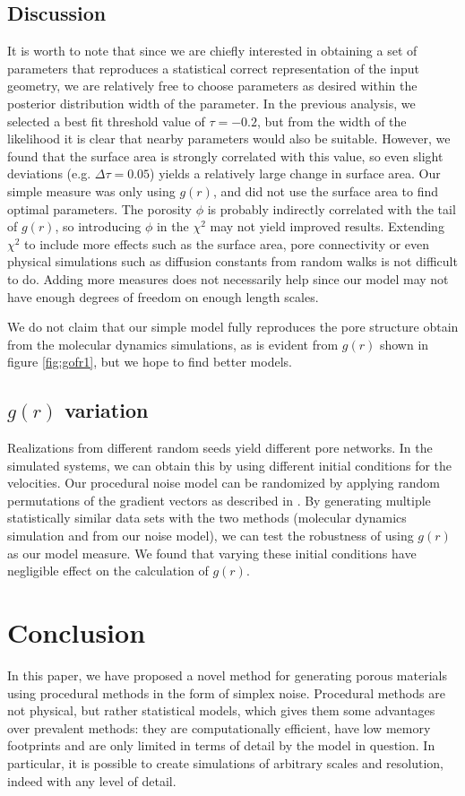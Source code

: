 \documentclass[aps,pre,twocolumn,letterpaper,floatfix,showpacs]{revtex4}
\begin{document}
\subsection{Discussion}
It is worth to note that since we are chiefly interested in obtaining a set of
parameters that reproduces a statistical correct representation of the input geometry,
we are relatively free to choose parameters as desired within the posterior distribution width of the parameter.
In the previous analysis, we selected a best fit threshold value of $\tau=-0.2$,
but from the width of the likelihood it is clear that nearby parameters would also be suitable. 
However, we found that the surface area is strongly correlated with this value, so even slight
deviations (e.g. $\Delta \tau = 0.05$) yields a relatively large change in surface area.
Our simple measure was only using $g(r)$, and did not use the surface area to find optimal parameters.
The porosity $\phi$ is probably indirectly correlated with the tail of $g(r)$, so introducing $\phi$ in the $\chi^2$ may not yield improved results.
Extending $\chi^2$ to include more effects such as the surface area, pore connectivity or even physical simulations such as diffusion constants from random walks is not difficult to do.
Adding more measures does not necessarily help since our model may not have enough degrees of freedom on enough length scales.

We do not claim that our simple model fully reproduces the pore structure obtain from the molecular dynamics simulations, as is evident from $g(r)$ shown in figure \ref{fig:gofr1},
but we hope to find better models.

\subsection{$g(r)$ variation}
Realizations from different random seeds yield different pore networks.
In the simulated systems, we can obtain this by using different initial conditions for the velocities.
Our procedural noise model can be randomized by applying random permutations of the gradient vectors as described in \cite{perlin1985image}.
By generating multiple statistically similar data sets with the two methods (molecular dynamics simulation and from our noise model), we can test the robustness of using $g(r)$ as our model measure.
We found that varying these initial conditions have negligible effect on the calculation of $g(r)$.

\section{Conclusion}
In this paper, we have proposed a novel method for generating porous materials using procedural methods in the form of simplex noise.
Procedural methods are not physical, but rather statistical models, which gives them some advantages over prevalent methods: they are computationally efficient, have low memory footprints and are only limited in terms of detail by the model in question. 
In particular, it is possible to create simulations of arbitrary scales and resolution, indeed with any level of detail. 
\end{document}
